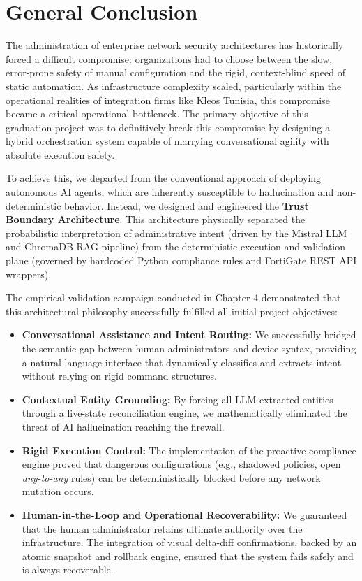 \chapter*{General Conclusion}

The administration of enterprise network security architectures has historically forced a difficult compromise: organizations had to choose between the slow, error-prone safety of manual configuration and the rigid, context-blind speed of static automation. As infrastructure complexity scaled, particularly within the operational realities of integration firms like Kleos Tunisia, this compromise became a critical operational bottleneck. The primary objective of this graduation project was to definitively break this compromise by designing a hybrid orchestration system capable of marrying conversational agility with absolute execution safety.

To achieve this, we departed from the conventional approach of deploying autonomous AI agents, which are inherently susceptible to hallucination and non-deterministic behavior. Instead, we designed and engineered the \textbf{Trust Boundary Architecture}. This architecture physically separated the probabilistic interpretation of administrative intent (driven by the Mistral LLM and ChromaDB RAG pipeline) from the deterministic execution and validation plane (governed by hardcoded Python compliance rules and FortiGate REST API wrappers).

The empirical validation campaign conducted in Chapter 4 demonstrated that this architectural philosophy successfully fulfilled all initial project objectives:
\begin{itemize}
    \item \textbf{Conversational Assistance and Intent Routing:} We successfully bridged the semantic gap between human administrators and device syntax, providing a natural language interface that dynamically classifies and extracts intent without relying on rigid command structures.
    \item \textbf{Contextual Entity Grounding:} By forcing all LLM-extracted entities through a live-state reconciliation engine, we mathematically eliminated the threat of AI hallucination reaching the firewall.
    \item \textbf{Rigid Execution Control:} The implementation of the proactive compliance engine proved that dangerous configurations (e.g., shadowed policies, open \textit{any-to-any} rules) can be deterministically blocked before any network mutation occurs.
    \item \textbf{Human-in-the-Loop and Operational Recoverability:} We guaranteed that the human administrator retains ultimate authority over the infrastructure. The integration of visual delta-diff confirmations, backed by an atomic snapshot and rollback engine, ensured that the system fails safely and is always recoverable.
\end{itemize}

